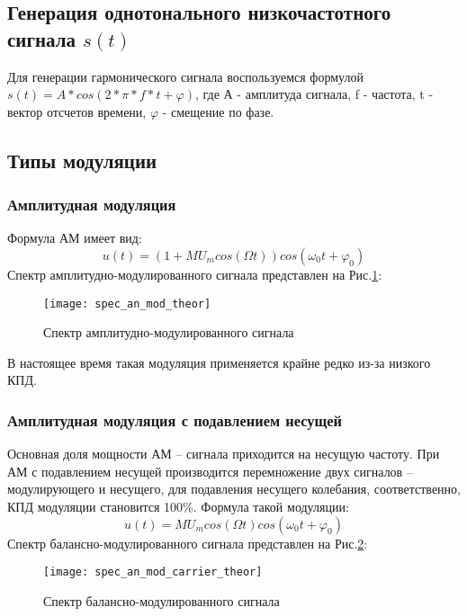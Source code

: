 \subsection{Генерация однотонального низкочастотного сигнала $s(t)$}
Для генерации гармонического сигнала воспользуемся формулой $s(t) = A*cos(2*\pi * f*t + \varphi)$, где А - амплитуда сигнала, f - частота, t - вектор отсчетов времени, $\varphi$ - смещение по фазе.

\subsection{Типы модуляции}
\subsubsection{Амплитудная модуляция}
Формула АМ имеет вид: 
\begin{equation}
	u(t) = (1 + M U_m cos(\Omega t)) cos(\omega_0 t + \varphi _0)
\end{equation}
Спектр амплитудно-модулированного сигнала представлен на Рис.\ref{pic:spec_an_mod_theor}:
\begin{figure}[H]
	\begin{center}
		\texttt{[image: spec\_an\_mod\_theor]}
		\caption{Спектр амплитудно-модулированного сигнала} 
		\label{pic:spec_an_mod_theor} %
	\end{center}
\end{figure}
В настоящее время такая модуляция применяется крайне редко из-за низкого КПД.

\subsubsection{Амплитудная модуляция с подавлением несущей}
Основная доля мощности АМ – сигнала приходится на несущую частоту. При АМ с подавлением несущей производится перемножение двух сигналов – модулирующего и несущего, для подавления несущего колебания, соответственно, КПД модуляции становится 100\%. Формула такой модуляции:
\begin{equation}
	u(t) = M U_m cos(\Omega t) cos(\omega_0 t + \varphi _0)
\end{equation}
Спектр балансно-модулированного сигнала представлен на Рис.\ref{pic:spec_an_mod_carrier_theor}:
\begin{figure}[H]
	\begin{center}
		\texttt{[image: spec\_an\_mod\_carrier\_theor]}
		\caption{Спектр балансно-модулированного сигнала} 
		\label{pic:spec_an_mod_carrier_theor} %
	\end{center}
\end{figure}

